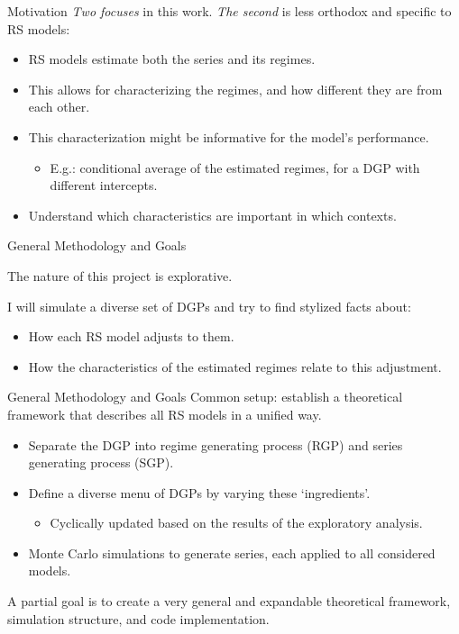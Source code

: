 \documentclass[
  ignorenonframetext,
]{beamer}
\providecommand{\tightlist}{%
  \setlength{\itemsep}{0pt}\setlength{\parskip}{0pt}}\usepackage{longtable,booktabs,array}
\begin{document}
\begin{frame}{Motivation}
\label{motivation-2}
\emph{Two focuses} in this work. \emph{The second} is less orthodox and
specific to RS models:

\begin{itemize}
\tightlist
\item
  RS models estimate both the series and its regimes.
\item
  This allows for characterizing the regimes, and how different they are
  from each other.
\item
  This characterization might be informative for the model's
  performance.

  \begin{itemize}
  \tightlist
  \item
    E.g.: conditional average of the estimated regimes, for a DGP with
    different intercepts.
  \end{itemize}
\item
  Understand which characteristics are important in which contexts.
\end{itemize}
\end{frame}

\begin{frame}{General Methodology and Goals}
\label{general-methodology-and-goals}

The nature of this project is explorative.

I will simulate a diverse set of DGPs and try to find stylized facts
about:

\begin{itemize}
\tightlist
\item
  How each RS model adjusts to them.
\item
  How the characteristics of the estimated regimes relate to this
  adjustment.
\end{itemize}
\end{frame}

\begin{frame}{General Methodology and Goals}
\label{general-methodology-and-goals-1}
Common setup: establish a theoretical framework that describes all RS
models in a unified way.

\begin{itemize}
\tightlist
\item
  Separate the DGP into regime generating process (RGP) and series
  generating process (SGP).
\item
  Define a diverse menu of DGPs by varying these `ingredients'.

  \begin{itemize}
  \tightlist
  \item
    Cyclically updated based on the results of the exploratory analysis.
  \end{itemize}
\item
  Monte Carlo simulations to generate series, each applied to all
  considered models.
\end{itemize}

A partial goal is to create a very general and expandable theoretical
framework, simulation structure, and code implementation.
\end{frame}
\end{document}
